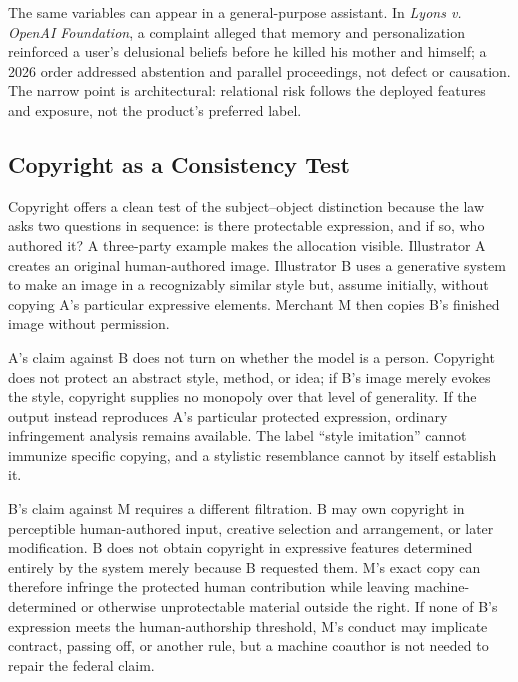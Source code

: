 The same variables can appear in a general-purpose assistant. In \emph{Lyons v. OpenAI Foundation}, a complaint alleged that memory and personalization reinforced a user's delusional beliefs before he killed his mother and himself; a 2026 order addressed abstention and parallel proceedings, not defect or causation. The narrow point is architectural: relational risk follows the deployed features and exposure, not the product's preferred label.

\subsection{Copyright as a Consistency Test}

Copyright offers a clean test of the subject--object distinction because the law asks two questions in sequence: is there protectable expression, and if so, who authored it? A three-party example makes the allocation visible. Illustrator A creates an original human-authored image. Illustrator B uses a generative system to make an image in a recognizably similar style but, assume initially, without copying A's particular expressive elements. Merchant M then copies B's finished image without permission.

A's claim against B does not turn on whether the model is a person. Copyright does not protect an abstract style, method, or idea; if B's image merely evokes the style, copyright supplies no monopoly over that level of generality. If the output instead reproduces A's particular protected expression, ordinary infringement analysis remains available. The label ``style imitation'' cannot immunize specific copying, and a stylistic resemblance cannot by itself establish it.

B's claim against M requires a different filtration. B may own copyright in perceptible human-authored input, creative selection and arrangement, or later modification. B does not obtain copyright in expressive features determined entirely by the system merely because B requested them. M's exact copy can therefore infringe the protected human contribution while leaving machine-determined or otherwise unprotectable material outside the right. If none of B's expression meets the human-authorship threshold, M's conduct may implicate contract, passing off, or another rule, but a machine coauthor is not needed to repair the federal claim.

